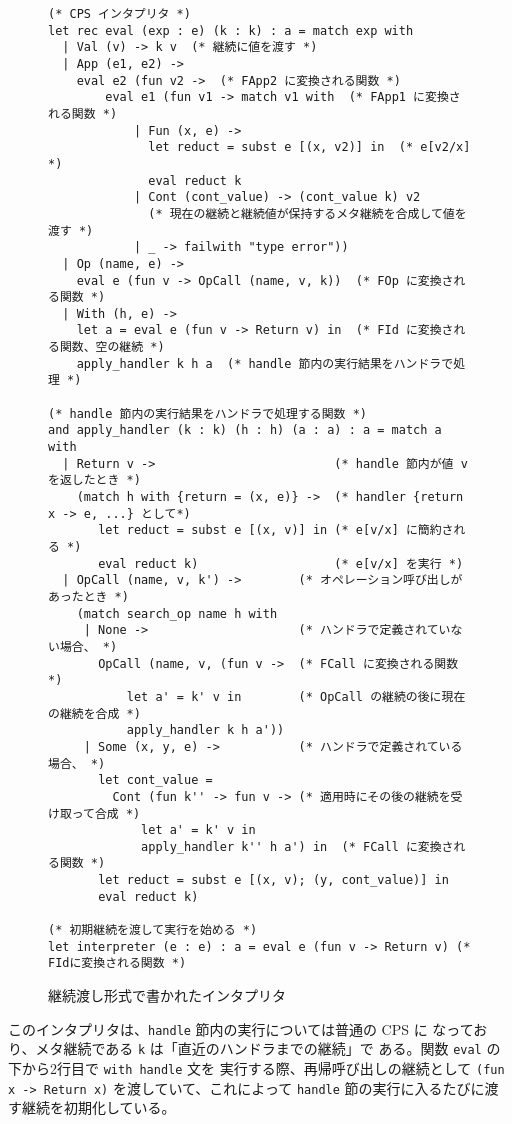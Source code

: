 \begin{figure}
\begin{verbatim}
(* CPS インタプリタ *)
let rec eval (exp : e) (k : k) : a = match exp with
  | Val (v) -> k v  (* 継続に値を渡す *)
  | App (e1, e2) ->
    eval e2 (fun v2 ->  (* FApp2 に変換される関数 *)
        eval e1 (fun v1 -> match v1 with  (* FApp1 に変換される関数 *)
            | Fun (x, e) ->
              let reduct = subst e [(x, v2)] in  (* e[v2/x] *)
              eval reduct k
            | Cont (cont_value) -> (cont_value k) v2
              (* 現在の継続と継続値が保持するメタ継続を合成して値を渡す *)
            | _ -> failwith "type error"))
  | Op (name, e) ->
    eval e (fun v -> OpCall (name, v, k))  (* FOp に変換される関数 *)
  | With (h, e) ->
    let a = eval e (fun v -> Return v) in  (* FId に変換される関数、空の継続 *)
    apply_handler k h a  (* handle 節内の実行結果をハンドラで処理 *)

(* handle 節内の実行結果をハンドラで処理する関数 *)
and apply_handler (k : k) (h : h) (a : a) : a = match a with
  | Return v ->                         (* handle 節内が値 v を返したとき *)
    (match h with {return = (x, e)} ->  (* handler {return x -> e, ...} として*)
       let reduct = subst e [(x, v)] in (* e[v/x] に簡約される *)
       eval reduct k)                   (* e[v/x] を実行 *)
  | OpCall (name, v, k') ->        (* オペレーション呼び出しがあったとき *)
    (match search_op name h with
     | None ->                     (* ハンドラで定義されていない場合、 *)
       OpCall (name, v, (fun v ->  (* FCall に変換される関数 *)
           let a' = k' v in        (* OpCall の継続の後に現在の継続を合成 *)
           apply_handler k h a'))
     | Some (x, y, e) ->           (* ハンドラで定義されている場合、 *)
       let cont_value =
         Cont (fun k'' -> fun v -> (* 適用時にその後の継続を受け取って合成 *)
             let a' = k' v in
             apply_handler k'' h a') in  (* FCall に変換される関数 *)
       let reduct = subst e [(x, v); (y, cont_value)] in
       eval reduct k)

(* 初期継続を渡して実行を始める *)
let interpreter (e : e) : a = eval e (fun v -> Return v) (* FIdに変換される関数 *)
\end{verbatim}
\caption{継続渡し形式で書かれたインタプリタ}
\label{figure:1cps}
\end{figure}

このインタプリタは、\texttt{handle} 節内の実行については普通の CPS に
なっており、メタ継続である \texttt{k} は「直近のハンドラまでの継続」で
ある。関数 \texttt{eval} の下から2行目で \texttt{with handle} 文を
実行する際、再帰呼び出しの継続として
\texttt{(fun x -> Return x)} を渡していて、これによって
\texttt{handle} 節の実行に入るたびに渡す継続を初期化している。

